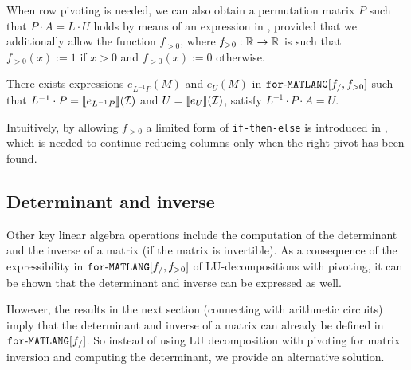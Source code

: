 When row pivoting is needed, we can also obtain a permutation matrix
$P$ such that $P\cdot A=L\cdot U$ holds by means of an expression in \langfor, provided
that we additionally allow the function $f_{>0}$, 
where $f_{>0}:\mathbb{R}\to\mathbb{R}$ is such that $f_{>0}(x):=1$ if $x>0$ and $f_{>0}(x):=0$ otherwise.

\begin{proposition}\label{prop:palu}
There exists expressions $e_{L^{-1}P}(M)$ and $e_U(M)$ in $\texttt{for}\text{-}\texttt{MATLANG}[f_/,f_{>0}]$  such that
$L^{-1}\cdot P=\llbracket e_{L^{-1}P} \rrbracket(\mathcal{I})$ and $U=\llbracket e_U \rrbracket(\mathcal{I})$, satisfy $L^{-1}\cdot P\cdot A=U$.
\end{proposition}



Intuitively, by allowing $f_{>0}$ a limited form of \texttt{if-then-else} is introduced in \langfor, which is needed
to continue reducing columns only when the right pivot has been found.


\subsection{Determinant and inverse}\label{sec:queries:inverse}
Other key linear algebra operations include the computation of the determinant and
the inverse of a matrix (if the matrix is invertible). As a consequence of the expressibility
in $\texttt{for}\text{-}\texttt{MATLANG}[f_/,f_{>0}]$ of LU-decompositions with pivoting, it can be shown that the determinant
and inverse can be expressed as well. 

However, the results
in the next section (connecting \langfor with arithmetic circuits) imply that the determinant
and inverse of a matrix can already be defined in $\texttt{for}\text{-}\texttt{MATLANG}[f_/]$. So instead of using LU decomposition with pivoting for matrix inversion and computing the determinant, we provide an alternative solution.

